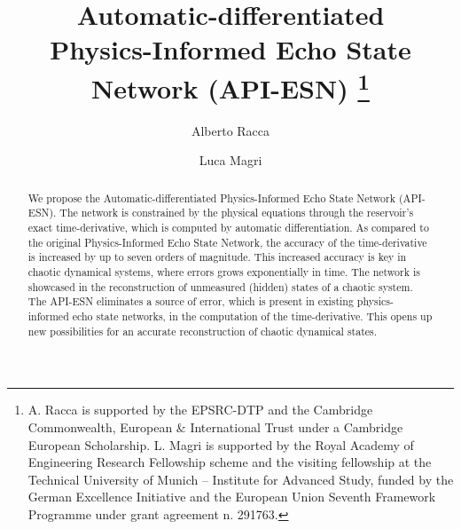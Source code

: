 \documentclass[runningheads]{llncs}
\begin{document}
%
\title{Automatic-differentiated \\ Physics-Informed Echo State Network (API-ESN)
\thanks{A. Racca is supported by the EPSRC-DTP and the Cambridge Commonwealth, European \& International Trust under a Cambridge European Scholarship. L. Magri is supported by the Royal Academy of Engineering Research Fellowship scheme and the visiting fellowship at the Technical University of Munich – Institute for Advanced Study, funded by the German Excellence Initiative and the European Union Seventh Framework Programme under grant agreement
n. 291763.}}
%
%
\author{Alberto Racca \and
Luca Magri}
%
%
%
\maketitle              %
%
\begin{abstract}
We propose the Automatic-differentiated Physics-Informed Echo State Network (API-ESN).
The network is constrained by the physical equations through the reservoir's exact time-derivative, which is computed by automatic differentiation.  
As compared to the original Physics-Informed Echo State Network, the accuracy of the time-derivative is increased by up to seven orders of magnitude. 
This increased accuracy is key in chaotic dynamical systems, where errors grows exponentially in time. 
The  network is showcased in the reconstruction of unmeasured (hidden) states of a chaotic system.
The API-ESN eliminates a source of error, which is present in existing physics-informed echo state networks, in the computation of the time-derivative. This opens up new possibilities for an accurate reconstruction of chaotic dynamical states.

\end{abstract}
%
%
%
\end{document}
